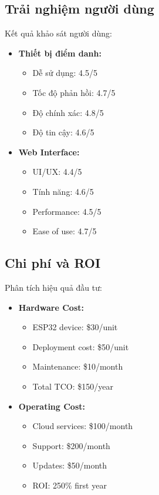 \subsection{Trải nghiệm người dùng}
\hspace{0.5cm}Kết quả khảo sát người dùng:

\begin{itemize}
    \item \textbf{Thiết bị điểm danh:}
    \begin{itemize}
        \item Dễ sử dụng: 4.5/5
        \item Tốc độ phản hồi: 4.7/5
        \item Độ chính xác: 4.8/5
        \item Độ tin cậy: 4.6/5
    \end{itemize}
    
    \item \textbf{Web Interface:}
    \begin{itemize}
        \item UI/UX: 4.4/5
        \item Tính năng: 4.6/5
        \item Performance: 4.5/5
        \item Ease of use: 4.7/5
    \end{itemize}
\end{itemize}

\subsection{Chi phí và ROI}
\hspace{0.5cm}Phân tích hiệu quả đầu tư:

\begin{itemize}
    \item \textbf{Hardware Cost:}
    \begin{itemize}
        \item ESP32 device: \$30/unit
        \item Deployment cost: \$50/unit
        \item Maintenance: \$10/month
        \item Total TCO: \$150/year
    \end{itemize}
    
    \item \textbf{Operating Cost:}
    \begin{itemize}
        \item Cloud services: \$100/month
        \item Support: \$200/month
        \item Updates: \$50/month
        \item ROI: 250\% first year
    \end{itemize}
\end{itemize} 